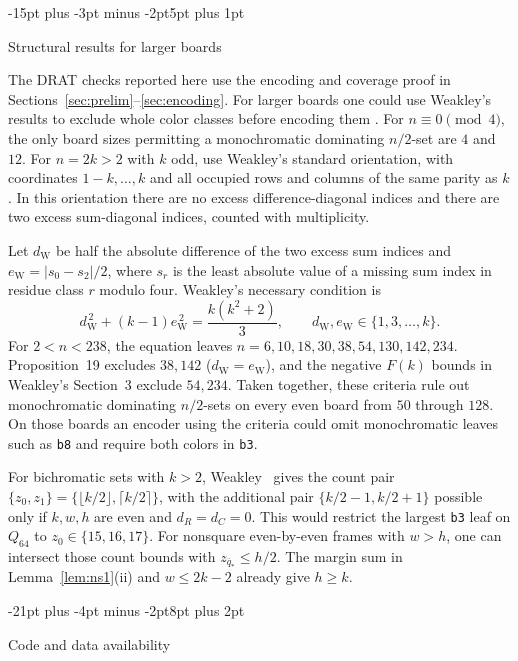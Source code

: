 \documentclass[11pt,a4paper]{article}
\makeatletter
\renewcommand{\section}{\@startsection{section}{1}{\z@}%
  {-21pt plus -4pt minus -2pt}{8pt plus 2pt}%
  {\normalfont\fontsize{14}{17}\selectfont\bfseries\raggedright}}
\renewcommand{\subsection}{\@startsection{subsection}{2}{\z@}%
  {-15pt plus -3pt minus -2pt}{5pt plus 1pt}%
  {\normalfont\bfseries\raggedright}}
\theoremstyle{result}
\theoremstyle{definition}
\theoremstyle{remark}
\makeatother
\begin{document}
\subsection{Structural results for larger boards}

The DRAT checks reported here use the encoding and coverage
proof in Sections~\ref{sec:prelim}--\ref{sec:encoding}. For
larger boards one could use Weakley's results to exclude whole
color classes before encoding them
\cite[Proposition~11, Theorems~17--18 and Section~3]{Weakley2022}.
For $n\equiv0\pmod4$, the only board sizes permitting a
monochromatic dominating $n/2$-set are $4$ and $12$. For
$n=2k>2$ with $k$ odd, use Weakley's standard orientation, with
coordinates $1-k,\ldots,k$ and all occupied rows and columns of
the same parity as $k$. In this orientation there are no excess
difference-diagonal indices and there are two excess sum-diagonal
indices, counted with multiplicity.

Let $d_{\mathrm W}$ be half the absolute difference of the two
excess sum indices and $e_{\mathrm W}=|s_0-s_2|/2$, where $s_r$ is the
least absolute value of a missing sum index in residue class $r$
modulo four. Weakley's necessary condition is
\[
  d_{\mathrm W}^{\,2}+(k-1)e_{\mathrm W}^{\,2}=\frac{k(k^2+2)}{3},
  \qquad d_{\mathrm W},e_{\mathrm W}\in\{1,3,\dots,k\}.
\]
For $2<n<238$, the equation leaves $n=6,10,18,30,38,54,130,142,234$.
Proposition~19 excludes $38,142$ ($d_{\mathrm W}=e_{\mathrm W}$),
and the negative $F(k)$ bounds in Weakley's Section~3 exclude
$54,234$. Taken together, these criteria rule out monochromatic
dominating $n/2$-sets on every even board from $50$ through $128$.
On those boards an encoder using the criteria could omit
monochromatic leaves such as \texttt{b8} and require both colors
in \texttt{b3}.

For bichromatic sets with $k>2$, Weakley~\cite[Proposition~11]{Weakley2022}
gives the count pair $\{z_0,z_1\}=\{\lfloor k/2\rfloor,\lceil k/2\rceil\}$,
with the additional pair $\{k/2-1,k/2+1\}$ possible only if $k,w,h$
are even and $d_R=d_C=0$. This would restrict the largest \texttt{b3}
leaf on $Q_{64}$ to $z_0\in\{15,16,17\}$. For nonsquare
even-by-even frames with $w>h$, one can intersect those count bounds
with $z_{\bar q_*}\le h/2$. The margin sum in Lemma~\ref{lem:ns1}(ii)
and $w\le2k-2$ already give $h\ge k$.

\section{Code and data availability}\label{sec:data}
\end{document}
